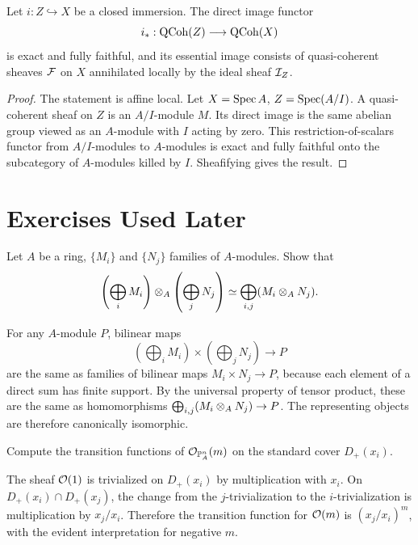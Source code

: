 \begin{proposition}
Let \(i:Z\hookrightarrow X\) be a closed immersion.  The direct image functor
\[
    i_*:\operatorname{QCoh}(Z)\longrightarrow \operatorname{QCoh}(X)
\]
is exact and fully faithful, and its essential image consists of
quasi-coherent sheaves \(\mathcal{F}\) on \(X\) annihilated locally by the ideal sheaf
\(\mathcal{I}_Z\).
\end{proposition}

\begin{proof}
The statement is affine local.  Let \(X=\operatorname{Spec} A\), \(Z=\operatorname{Spec}(A/I)\).  A
quasi-coherent sheaf on \(Z\) is an \(A/I\)-module \(M\).  Its direct image is
the same abelian group viewed as an \(A\)-module with \(I\) acting by zero.
This restriction-of-scalars functor from \(A/I\)-modules to \(A\)-modules is
exact and fully faithful onto the subcategory of \(A\)-modules killed by
\(I\).  Sheafifying gives the result.
\end{proof}

\section{Exercises Used Later}

\begin{exercise}\label{ex:tensor-direct-sums}
Let \(A\) be a ring, \(\{M_i\}\) and \(\{N_j\}\) families of \(A\)-modules.
Show that
\[
    \left(\bigoplus_i M_i\right)\otimes_A
    \left(\bigoplus_j N_j\right)
    \simeq
    \bigoplus_{i,j}(M_i\otimes_A N_j).
\]
\end{exercise}

\begin{solution}
For any \(A\)-module \(P\), bilinear maps
\[
    \left(\bigoplus_i M_i\right)\times
    \left(\bigoplus_j N_j\right)\to P
\]
are the same as families of bilinear maps \(M_i\times N_j\to P\), because
each element of a direct sum has finite support.  By the universal property of
tensor product, these are the same as homomorphisms
\(\bigoplus_{i,j}(M_i\otimes_A N_j)\to P\).  The representing objects are
therefore canonically isomorphic.
\end{solution}

\begin{exercise}\label{ex:twisting-transitions}
Compute the transition functions of \(\mathcal{O}_{\mathbb{P}^n_A}(m)\) on the standard cover
\(D_+(x_i)\).
\end{exercise}

\begin{solution}
The sheaf \(\mathcal{O}(1)\) is trivialized on \(D_+(x_i)\) by multiplication with
\(x_i\).  On \(D_+(x_i)\cap D_+(x_j)\), the change from the \(j\)-trivialization
to the \(i\)-trivialization is multiplication by \(x_j/x_i\).  Therefore the
transition function for \(\mathcal{O}(m)\) is \((x_j/x_i)^m\), with the evident
interpretation for negative \(m\).
\end{solution}

